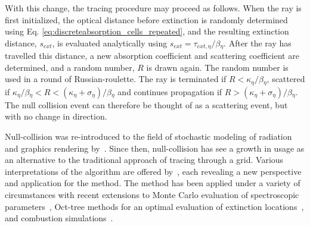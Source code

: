 With this change, the tracing procedure may proceed as follows. When the ray is first initialized, the optical distance before extinction is randomly determined using Eq. \ref{eq:discreteabsorption_cells_repeated}, and the resulting extinction distance, $s_{ext}$, is evaluated analytically using $s_{ext}=\tau{}_{ext,\eta}/\beta{}_\eta{}$.
After the ray has travelled this distance, a new absorption coefficient and scattering coefficient are determined, and a random number, $R$ is drawn again.
The random number is used in a round of Russian-roulette.
The ray is terminated if $R<\kappa{}_\eta{}/\beta{}_\eta{}$, scattered if $\kappa{}_\eta{}/\beta{}_\eta{}<R<(\kappa{}_\eta{}+\sigma{}_\eta{})/\beta{}_\eta{}$ and continues propagation if $R>(\kappa{}_\eta{}+\sigma{}_\eta{})/\beta{}_\eta{}$. 
The null collision event can therefore be thought of as a scattering event, but with no change in direction.

Null-collision was re-introduced to the field of stochastic modeling of radiation and graphics rendering by~\citet{Galtier2013IntegralAlgorithms}. Since then, null-collision has see a growth in usage as an alternative to the traditional approach of tracing through a grid. 
Various interpretations of the algorithm are offered by~\citet{ElHafi2021ThreeAlgorithms}, each revealing a new perspective and application for the method.
The method has been applied under a variety of circumstances with recent extensions to Monte Carlo evaluation of spectroscopic parameters~\cite{Galtier2015RadiativeApproach}, Oct-tree methods for an optimal evaluation of extinction locations~\cite{Villefranque2019AAtmospheres}, and combustion simulations~\cite{Eymet2013Null-collisionSimulators}.


